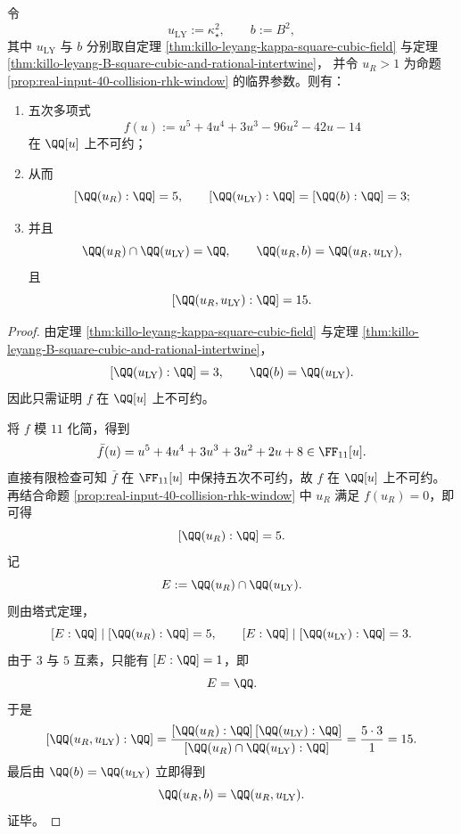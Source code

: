 \begin{theorem}\label{thm:gut-leyang-rh-field-decoupling}
令
\[
u_{\mathrm{LY}}:=\kappa_\star^2,
\qquad
b:=B^2,
\]
其中 \(u_{\mathrm{LY}}\) 与 \(b\) 分别取自定理 \ref{thm:killo-leyang-kappa-square-cubic-field} 与定理 \ref{thm:killo-leyang-B-square-cubic-and-rational-intertwine}，
并令 \(u_R>1\) 为命题 \ref{prop:real-input-40-collision-rhk-window} 的临界参数。则有：
\begin{enumerate}
  \item 五次多项式
  \[
  f(u):=u^5+4u^4+3u^3-96u^2-42u-14
  \]
  在 \(\QQ[u]\) 上不可约；
  \item 从而
  \[
  [\QQ(u_R):\QQ]=5,
  \qquad
  [\QQ(u_{\mathrm{LY}}):\QQ]=[\QQ(b):\QQ]=3;
  \]
  \item 并且
  \[
  \QQ(u_R)\cap \QQ(u_{\mathrm{LY}})=\QQ,
  \qquad
  \QQ(u_R,b)=\QQ(u_R,u_{\mathrm{LY}}),
  \]
  且
  \[
  [\QQ(u_R,u_{\mathrm{LY}}):\QQ]=15.
  \]
\end{enumerate}
\end{theorem}
\begin{proof}
由定理 \ref{thm:killo-leyang-kappa-square-cubic-field} 与定理 \ref{thm:killo-leyang-B-square-cubic-and-rational-intertwine}，
\[
[\QQ(u_{\mathrm{LY}}):\QQ]=3,
\qquad
\QQ(b)=\QQ(u_{\mathrm{LY}}).
\]
因此只需证明 \(f\) 在 \(\QQ[u]\) 上不可约。
\par
将 \(f\) 模 \(11\) 化简，得到
\[
\bar f(u)=u^5+4u^4+3u^3+3u^2+2u+8\in \FF_{11}[u].
\]
直接有限检查可知 \(\bar f\) 在 \(\FF_{11}[u]\) 中保持五次不可约，故 \(f\) 在 \(\QQ[u]\) 上不可约。
再结合命题 \ref{prop:real-input-40-collision-rhk-window} 中 \(u_R\) 满足 \(f(u_R)=0\)，即可得
\[
[\QQ(u_R):\QQ]=5.
\]
记
\[
E:=\QQ(u_R)\cap \QQ(u_{\mathrm{LY}}).
\]
则由塔式定理，
\[
[E:\QQ]\mid [\QQ(u_R):\QQ]=5,
\qquad
[E:\QQ]\mid [\QQ(u_{\mathrm{LY}}):\QQ]=3.
\]
由于 \(3\) 与 \(5\) 互素，只能有 \([E:\QQ]=1\)，即
\[
E=\QQ.
\]
于是
\[
[\QQ(u_R,u_{\mathrm{LY}}):\QQ]
=
\frac{[\QQ(u_R):\QQ]\,[\QQ(u_{\mathrm{LY}}):\QQ]}{[\QQ(u_R)\cap\QQ(u_{\mathrm{LY}}):\QQ]}
=
\frac{5\cdot 3}{1}
=
15.
\]
最后由 \(\QQ(b)=\QQ(u_{\mathrm{LY}})\) 立即得到
\[
\QQ(u_R,b)=\QQ(u_R,u_{\mathrm{LY}}).
\]
证毕。
\end{proof}

